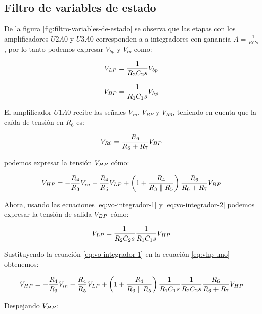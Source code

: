 \subsection{Filtro de variables de estado}

De la figura \ref{fig:filtro-variables-de-estado} se observa que las etapas con los amplificadores $U2A0$ y $U3A0$ corresponden a a integradores con ganancia $A = \frac{1}{RCs}$, por lo tanto podemos expresar $V_{bp}$ y $V_{lp}$ como:

\begin{equation}
    V_{LP} = \frac{1}{R_2 C_2 s}V_{bp}
    \label{eq:vo-integrador-2}
\end{equation}

\begin{equation}
    V_{BP} = \frac{1}{R_1 C_1 s}V_{hp}
    \label{eq:vo-integrador-1}
\end{equation}

El amplificador $U1A0$ recibe las señales $V_{in}$, $V_{BP}$ y $V_{R6}$, teniendo en cuenta que la caída de tensión en $R_6$ es:

$$V_{R6} = \frac{R_6}{R_6 + R_7}V_{BP}$$

podemos expresar la tensión $V_{HP}$ cómo:

\begin{equation}
    V_{HP} = -\frac{R_4}{R_3}V_{in} -\frac{R_4}{R_5}V_{LP} + \left (1 + \frac{R_4}{R_3 \parallel R_5}\right )\frac{R_6}{R_6 + R_7}V_{BP}
    \label{eq:vhp-uno}
\end{equation}

Ahora, usando las ecuaciones \ref{eq:vo-integrador-1} y \ref{eq:vo-integrador-2} podemos expresar la tensión de salida $V_{BP}$ cómo:

\begin{equation}
    V_{LP} = \frac{1}{R_2 C_2 s} \frac{1}{R_1 C_1 s}V_{HP}
    \label{eq:vlp-ambos-integradores}
\end{equation}

Sustituyendo la ecuación \ref{eq:vo-integrador-1} en la ecuación \ref{eq:vhp-uno} obtenemos:

\begin{equation}
    V_{HP} = -\frac{R_4}{R_3}V_{in} -\frac{R_4}{R_5}V_{LP} + \left( 1 + \frac{R_4}{R_3 \parallel R_5} \right)\frac{1}{R_1 C_1 s}\frac{1}{R_2 C_2 s}\frac{R_6}{R_6 + R_7}V_{HP}
    \label{eq:vhp-dos}
\end{equation}

Despejando $V_{HP}$:

\newcommand{\VHPEq}{
    - \frac{\frac{R_4}{R_3}\VIN + \frac{R_4}{R_5}\VLP}{1 + \frac{R_6}{R_6 + R_7} \WrapParenthesis{1 + \frac{R_4}{R_3 \parallel R_5}}\frac{1}{R_1 C_1 s}}
}
\newcommand{\Numerador}{\frac{R_4}{R_3}\VIN + \frac{R_4}{R_5}\VLP}

